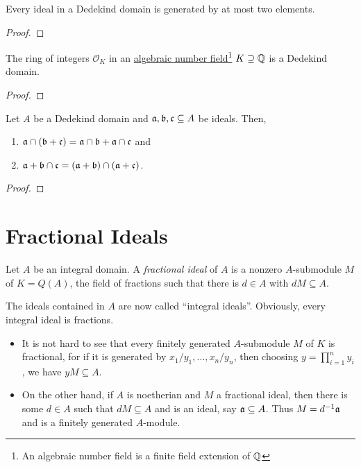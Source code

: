 \begin{corollary}
    Every ideal in a Dedekind domain is generated by at most two elements.
\end{corollary}
\begin{proof}
\end{proof}

\begin{theorem}
    The ring of integers $\mathcal{O}_K$ in an \underline{algebraic number field}\footnote{An algebraic number field is a finite field extension of $\mathbb{Q}$} $K\supseteq\mathbb{Q}$ is a Dedekind domain.
\end{theorem}
\begin{proof}
\end{proof}

\begin{proposition}
    Let $A$ be a Dedekind domain and $\mathfrak a,\mathfrak b,\mathfrak c\subseteq A$ be ideals. Then, 
    \begin{enumerate}[label=(\alph*)]
        \item $\mathfrak a\cap(\mathfrak b + \mathfrak c) = \mathfrak a\cap\mathfrak b + \mathfrak a\cap\mathfrak c$ and
        \item $\mathfrak a + \mathfrak b\cap\mathfrak c = (\mathfrak a + \mathfrak b)\cap(\mathfrak a + \mathfrak c)$.
    \end{enumerate}
\end{proposition}
\begin{proof}
    
\end{proof}

\section{Fractional Ideals}


\begin{definition}
    Let $A$ be an integral domain. A \emph{fractional ideal} of $A$ is a nonzero $A$-submodule $M$ of $K = Q(A)$, the field of fractions such that there is $d\in A$ with $dM\subseteq A$.
\end{definition}

The ideals contained in $A$ are now called ``integral ideals''. Obviously, every integral ideal is fractions. 

\begin{itemize}
    \item It is not hard to see that every finitely generated $A$-submodule $M$ of $K$ is fractional, for if it is generated by $x_1/y_1,\ldots,x_n/y_n$, then choosing $y = \prod_{i = 1}^n y_i$, we have $yM\subseteq A$.

    \item On the other hand, if $A$ is noetherian and $M$ a fractional ideal, then there is some $d\in A$ such that $dM\subseteq A$ and is an ideal, say $\mathfrak a\subseteq A$. Thus $M = d^{-1}\mathfrak a$ and is a finitely generated $A$-module.
\end{itemize}

